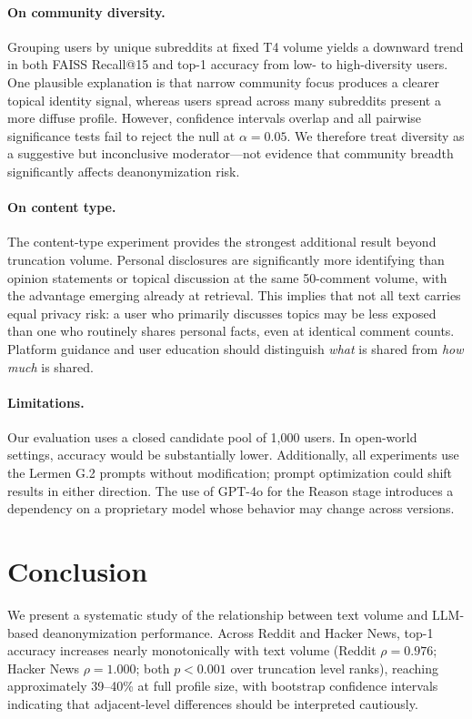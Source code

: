 \documentclass[sigplan,screen,nonacm]{acmart}
\begin{document}
\paragraph{On community diversity.}
Grouping users by unique subreddits at fixed T4 volume yields a downward trend in
both FAISS Recall@15 and top-1 accuracy from low- to high-diversity users. One
plausible explanation is that narrow community focus produces a clearer topical
identity signal, whereas users spread across many subreddits present a more diffuse
profile. However, confidence intervals overlap and all pairwise significance tests
fail to reject the null at $\alpha = 0.05$. We therefore treat diversity as a
suggestive but inconclusive moderator---not evidence that community breadth
significantly affects deanonymization risk.

\paragraph{On content type.}
The content-type experiment provides the strongest additional result beyond
truncation volume. Personal disclosures are significantly more identifying than
opinion statements or topical discussion at the same 50-comment volume, with the
advantage emerging already at retrieval. This implies that not all text carries equal
privacy risk: a user who primarily discusses topics may be less exposed than one who
routinely shares personal facts, even at identical comment counts. Platform guidance
and user education should distinguish \textit{what} is shared from \textit{how much}
is shared.

\paragraph{Limitations.}
Our evaluation uses a closed candidate pool of 1{,}000 users. In open-world settings,
accuracy would be substantially lower. Additionally, all experiments use the Lermen
G.2 prompts without modification; prompt optimization could shift results in either
direction. The use of GPT-4o for the Reason stage introduces a dependency on a
proprietary model whose behavior may change across versions.


\section{Conclusion}


We present a systematic study of the relationship between text volume and LLM-based
deanonymization performance. Across Reddit and Hacker News, top-1 accuracy increases
nearly monotonically with text volume (Reddit $\rho = 0.976$; Hacker News
$\rho = 1.000$; both $p < 0.001$ over truncation level ranks), reaching
approximately 39--40\% at full profile size, with bootstrap confidence intervals
indicating that adjacent-level differences should be interpreted cautiously.
\end{document}
